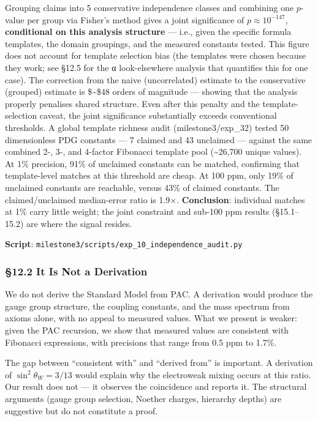 \documentclass[
  11pt,
  a4paper]{article}
\begin{document}
Grouping claims into 5 conservative independence classes and combining
one \(p\)-value per group via Fisher's method gives a joint significance
of \(p \approx 10^{-147}\), \textbf{conditional on this analysis
structure} --- i.e., given the specific formula templates, the domain
groupings, and the measured constants tested. This figure does not
account for template selection bias (the templates were chosen because
they work; see §12.5 for the α look-elsewhere analysis that quantifies
this for one case). The correction from the naive (uncorrelated)
estimate to the conservative (grouped) estimate is \$\sim\$48 orders of
magnitude --- showing that the analysis properly penalises shared
structure. Even after this penalty and the template-selection caveat,
the joint significance substantially exceeds conventional thresholds. A
global template richness audit (milestone3/exp\_32) tested 50
dimensionless PDG constants --- 7 claimed and 43 unclaimed --- against
the same combined 2-, 3-, and 4-factor Fibonacci template pool
(\textasciitilde26,700 unique values). At 1\% precision, 91\% of
unclaimed constants can be matched, confirming that template-level
matches at this threshold are cheap. At 100 ppm, only 19\% of unclaimed
constants are reachable, versus 43\% of claimed constants. The
claimed/unclaimed median-error ratio is 1.9×. \textbf{Conclusion}:
individual matches at 1\% carry little weight; the joint constraint and
sub-100 ppm results (§15.1--15.2) are where the signal resides.

\textbf{Script}:
\texttt{milestone3/scripts/exp\_10\_independence\_audit.py}

\subsubsection{§12.2 It Is Not a
Derivation}\label{it-is-not-a-derivation}

We do not derive the Standard Model from PAC. A derivation would produce
the gauge group structure, the coupling constants, and the mass spectrum
from axioms alone, with no appeal to measured values. What we present is
weaker: given the PAC recursion, we show that measured values are
consistent with Fibonacci expressions, with precisions that range from
0.5 ppm to 1.7\%.

The gap between ``consistent with'' and ``derived from'' is important. A
derivation of \(\sin^2\theta_W = 3/13\) would explain why the
electroweak mixing occurs at this ratio. Our result does not --- it
observes the coincidence and reports it. The structural arguments (gauge
group selection, Noether charges, hierarchy depths) are suggestive but
do not constitute a proof.
\end{document}
